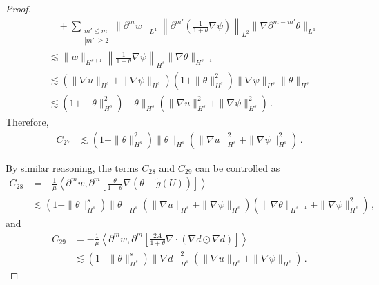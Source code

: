 \documentclass[reqno,11pt]{amsart}
\numberwithin{equation}{section}
\begin{document}
\begin{proof}
\begin{equation*}
\begin{aligned}
&\quad + \sum_{\substack{m' \leq m \\ |m'| \geq 2}} \|\partial^m w\|_{L^4} \left\| \partial^{m'} \left(\frac{1}{1+\theta} \nabla \psi\right) \right\|_{L^2} \|\nabla \partial^{m-m'} \theta\|_{L^4} \\
&\lesssim \|w\|_{H^{s+1}} \left\| \frac{1}{1+\theta} \nabla \psi \right\|_{H^s} \|\nabla \theta\|_{H^{s-1}} \\
&\lesssim (\|\nabla u\|_{H^s} + \|\nabla \psi\|_{H^s}) (1 + \|\theta\|_{H^s}^2) \|\nabla \psi\|_{H^s} \|\theta\|_{H^s} \\
&\lesssim (1 + \|\theta\|_{H^s}^2) \|\theta\|_{H^s} (\|\nabla u\|_{H^s}^2 + \|\nabla \psi\|_{H^s}^2) \,.
\end{aligned}
\end{equation*}
Therefore,
\begin{equation}\label{gpsi-eq21}
\begin{aligned}
C_{27}&\lesssim \left( 1 + \|\theta\|_{H^s}^2 \right) \|\theta\|_{H^s} (\|\nabla u\|_{H^s}^2 + \|\nabla \psi\|_{H^s}^2) \,.
\end{aligned}
\end{equation}

By similar reasoning, the terms $C_{28}$ and $C_{29}$ can be controlled as
\begin{equation}\label{gpsi-eq22}
\begin{aligned}
C_{28}&= -\frac{1}{\mu} \left\langle \partial^m w, \partial^m \left[\frac{\theta}{1+\theta} \nabla (\theta + \tilde{g}(U))\right] \right\rangle \\
&\lesssim (1 + \|\theta\|_{H^s}^s) \|\theta\|_{H^s} (\|\nabla u\|_{H^s} + \|\nabla \psi\|_{H^s}) (\|\nabla \theta\|_{H^{s-1}} + \|\nabla \psi\|_{H^s}^2) \,,
\end{aligned}
\end{equation}
and 
\begin{equation}\label{gpsi-eq23}
\begin{aligned}
C_{29}&=-\frac{1}{\mu} \left\langle \partial^m w, \partial^m \left[\frac{2A}{1+\theta} \nabla \cdot (\nabla d \odot \nabla d)\right] \right\rangle \\
&\lesssim (1 + \|\theta\|_{H^s}^s) \|\nabla d\|_{H^s}^2 (\|\nabla u\|_{H^s} + \|\nabla \psi\|_{H^s}) \,.
\end{aligned}
\end{equation}


\end{proof}
\end{document}
